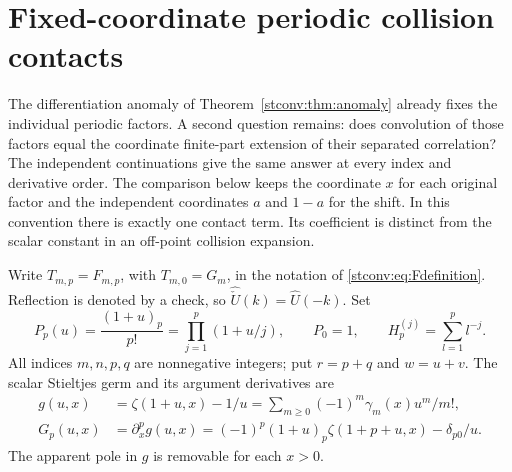 \providecommand{\pccD}{\mathrm D}
\providecommand{\pccZ}{\mathcal Z}
\providecommand{\pccA}{\mathcal A}
\providecommand{\pccE}{\mathcal E}
\providecommand{\pccJ}{\mathsf J}
\providecommand{\pccC}{\mathsf C}
\providecommand{\pccI}{\mathcal I}
\section{Fixed-coordinate periodic collision contacts}
\label{pc:scope}
The differentiation anomaly of Theorem~\ref{stconv:thm:anomaly} already
fixes the individual periodic factors. A second question remains: does
convolution of those factors equal the coordinate finite-part extension
of their separated correlation? The independent continuations
\cite{pcc:reports} give the same answer at every index and derivative order.
The comparison below keeps the coordinate $x$ for each original factor and
the independent coordinates $a$ and $1-a$ for the shift. In this convention
there is exactly one contact term. Its coefficient is distinct from the
scalar constant in an off-point collision expansion.

Write $T_{m,p}=F_{m,p}$, with $T_{m,0}=G_m$, in the notation of
\eqref{stconv:eq:Fdefinition}. Reflection is denoted by a check, so
$\widehat{\check U}(k)=\widehat U(-k)$. Set
\[
 P_p(u)=\frac{(1+u)_p}{p!}=\prod_{j=1}^p(1+u/j),\qquad P_0=1,
 \qquad H_p^{(j)}=\sum_{l=1}^p l^{-j}.
\]
All indices $m,n,p,q$ are nonnegative integers; put $r=p+q$ and $w=u+v$.
The scalar Stieltjes germ and its argument derivatives are
\begin{align}
 g(u,x)&=\zeta(1+u,x)-1/u
       =\sum_{m\ge0}(-1)^m\gamma_m(x)u^m/m!,\label{pc:gdef}\\
 G_p(u,x)&=\partial_x^p g(u,x)
   =(-1)^p(1+u)_p\zeta(1+p+u,x)-\delta_{p0}/u.\label{pc:G}
\end{align}
The apparent pole in $g$ is removable for each $x>0$.

